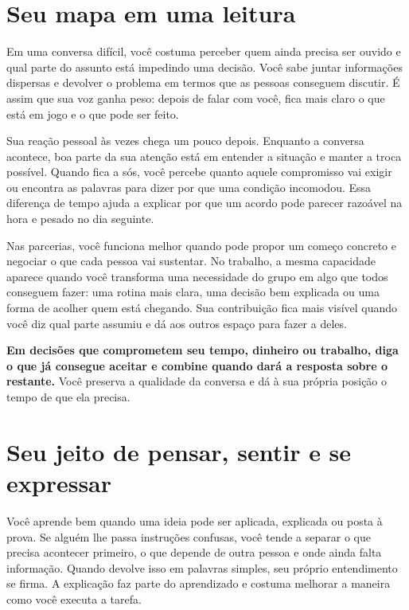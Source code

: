 \section*{Seu mapa em uma leitura}

Em uma conversa difícil, você costuma perceber quem ainda precisa ser ouvido e qual parte do assunto está impedindo uma decisão. Você sabe juntar informações dispersas e devolver o problema em termos que as pessoas conseguem discutir. É assim que sua voz ganha peso: depois de falar com você, fica mais claro o que está em jogo e o que pode ser feito.

Sua reação pessoal às vezes chega um pouco depois. Enquanto a conversa acontece, boa parte da sua atenção está em entender a situação e manter a troca possível. Quando fica a sós, você percebe quanto aquele compromisso vai exigir ou encontra as palavras para dizer por que uma condição incomodou. Essa diferença de tempo ajuda a explicar por que um acordo pode parecer razoável na hora e pesado no dia seguinte.

Nas parcerias, você funciona melhor quando pode propor um começo concreto e negociar o que cada pessoa vai sustentar. No trabalho, a mesma capacidade aparece quando você transforma uma necessidade do grupo em algo que todos conseguem fazer: uma rotina mais clara, uma decisão bem explicada ou uma forma de acolher quem está chegando. Sua contribuição fica mais visível quando você diz qual parte assumiu e dá aos outros espaço para fazer a deles.

\textbf{Em decisões que comprometem seu tempo, dinheiro ou trabalho, diga o que já consegue aceitar e combine quando dará a resposta sobre o restante.} Você preserva a qualidade da conversa e dá à sua própria posição o tempo de que ela precisa.

\clearpage
\section*{Seu jeito de pensar, sentir e se expressar}

Você aprende bem quando uma ideia pode ser aplicada, explicada ou posta à prova. Se alguém lhe passa instruções confusas, você tende a separar o que precisa acontecer primeiro, o que depende de outra pessoa e onde ainda falta informação. Quando devolve isso em palavras simples, seu próprio entendimento se firma. A explicação faz parte do aprendizado e costuma melhorar a maneira como você executa a tarefa.

